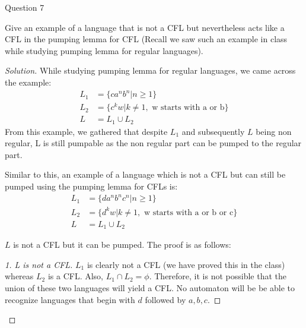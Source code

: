 \begin{solution}{Question 7}\label{ques:7}
    \begin{question}
     Give an example of a language that is not a CFL but nevertheless acts like a CFL in the pumping lemma for CFL (Recall we saw such an example in class while studying pumping lemma for regular languages). 
    \end{question}
    \tcblower{}
    \begin{proof}[Solution]
        While studying pumping lemma for regular languages, we came across the example: 
        \begin{equation}
            \begin{split}
                L_1 &= \{ ca^n b^n | n \geq 1\}\\
                L_2 &= \{ c^kw | k\neq 1, \text{ w starts with a or b}\}\\
                L &= L_1 \cup L_2
            \end{split}
        \end{equation}
        From this example, we gathered that despite $L_1$ and subsequently $L$ being non regular, L is still pumpable as the non regular part can be pumped to the regular part.\par
        Similar to this, an example of a language which is not a CFL but can still be pumped using the pumping lemma for CFLs is:
        \begin{equation}
            \begin{split}
                L_1 &= \{ d a^n b^n c^n | n \geq 1\}\\
                L_2 &= \{ d^kw | k\neq 1, \text{ w starts with a or b or c}\}\\
                L &= L_1 \cup L_2
            \end{split}
        \end{equation}
        
        $L$ is not a CFL but it can be pumped. The proof is as follows:
        
        \begin{proof}[1. L is not a CFL]
            $L_1$ is clearly not a CFL (we have proved this in the class) whereas $L_2$ is a CFL. Also, $L_1 \cap L_2 = \phi$. Therefore, it is not possible that the union of these two languages will yield a CFL. No automaton will be be able to recognize languages that begin with $d$ followed by $a, b, c$.
        \end{proof}
        

\end{proof}
\end{solution}
